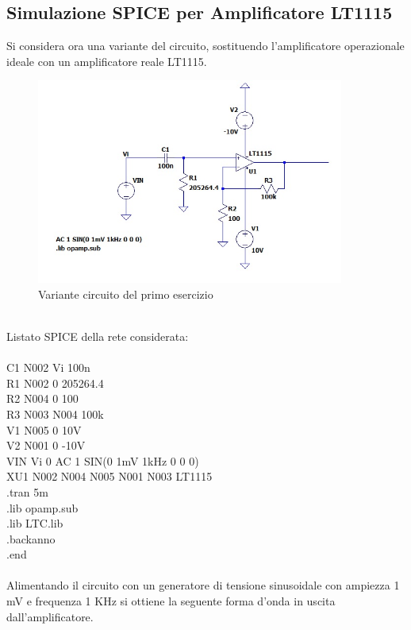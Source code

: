 \newpage
\subsection{Simulazione SPICE per Amplificatore LT1115}\label{subsec:simulazione_LT1115}
Si considera ora una variante del circuito, sostituendo l'amplificatore operazionale ideale con un amplificatore reale LT1115.
\begin{figure}[h]
    \centering
    \includegraphics[width=0.9\textwidth]{Figure/Circuito.jpg}
    \caption{Variante circuito del primo esercizio}
    \label{fig:Circuito}
\end{figure}\\
Listato SPICE della rete considerata:\\
\\
C1 N002 Vi 100n\\
R1 N002 0 205264.4\\
R2 N004 0 100\\
R3 N003 N004 100k\\
V1 N005 0 10V\\
V2 N001 0 -10V\\
VIN Vi 0 AC 1 SIN(0 1mV 1kHz 0 0 0)\\
XU1 N002 N004 N005 N001 N003 LT1115\\
.tran 5m\\
.lib opamp.sub\\
.lib LTC.lib\\
.backanno\\
.end\\
\\
Alimentando il circuito con un generatore di tensione sinusoidale con ampiezza 1 mV e frequenza 1 KHz si ottiene la seguente forma d'onda in uscita dall'amplificatore.
\newpage
